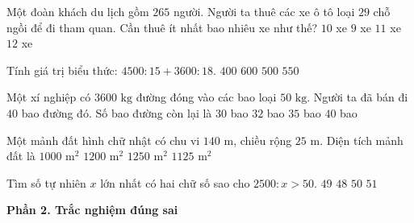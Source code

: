 \begin{ex} %
Một đoàn khách du lịch gồm $265$ người. Người ta thuê các xe ô tô loại $29$ chỗ ngồi để đi tham quan. Cần thuê ít nhất bao nhiêu xe như thế?
\choice
{\True $10$ xe}
{$9$ xe}
{$11$ xe}
{$12$ xe}
\end{ex}

\begin{ex} %
Tính giá trị biểu thức: $4500 : 15 + 3600 : 18$.
\choice
{$400$}
{$600$}
{\True $500$}
{$550$}
\end{ex}

\begin{ex} %
Một xí nghiệp có $3600\text{ kg}$ đường đóng vào các bao loại $50\text{ kg}$. Người ta đã bán đi $40$ bao đường đó. Số bao đường còn lại là
\choice
{$30$ bao}
{\True $32$ bao}
{$35$ bao}
{$40$ bao}
\end{ex}

\begin{ex} %
Một mảnh đất hình chữ nhật có chu vi $140\text{ m}$, chiều rộng $25\text{ m}$. Diện tích mảnh đất là
\choice
{$1000\text{ m}^2$}
{$1200\text{ m}^2$}
{$1250\text{ m}^2$}
{\True $1125\text{ m}^2$}
\end{ex}

\begin{ex} %
Tìm số tự nhiên $x$ lớn nhất có hai chữ số sao cho $2500 : x > 50$.
\choice
{\True $49$}
{$48$}
{$50$}
{$51$}
\end{ex}

\textbf{Phần 2. Trắc nghiệm đúng sai}

